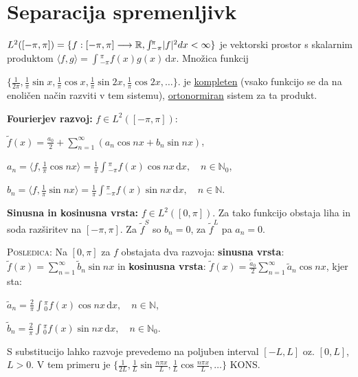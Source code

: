 \documentclass[10pt,a4paper]{amsart}
\theoremstyle{definition} %
\theoremstyle{plain} %
\newcommand{\dx}{\ensuremath{\,\mathrm{d}x}}
\let\oldint\int
\renewcommand{\int}{\oldint \!}
\newcommand{\R}{\mathbb R}
\newcommand{\N}{\mathbb N}
\begin{document}
\thispagestyle{empty}
\setlength{\parindent}{0pt}




\section*{Separacija spremenljivk}

$L^2([-\pi,\pi]) = \{f:[-\pi,\pi]\longrightarrow \R, \int_{-\pi}^\pi |f|^2
\\dx < \infty \}$ je vektorski prostor s skalarnim produktom $\langle f, g\rangle =
\int_{-\pi}^\pi f(x)g(x)\dx$. Množica funkcij

  $\{\frac{1}{2\pi},
  \frac{1}{\pi}\sin{x},\frac{1}{\pi}\cos{x},\frac{1}{\pi}\sin{2x},\frac{1}{\pi}\cos{2x},\ldots
\}$. je \underline{kompleten} (vsako funkcijo se da na enoličen način razviti v
tem sistemu),  \underline{ortonormiran} sistem za ta produkt.

\textbf{Fourierjev razvoj:} $f \in L^2([-\pi,\pi])$:

$\tilde{f}(x) = \frac{a_0}{2} + \sum_{n=1}^{\infty}(a_n\cos{nx} + b_n\sin{nx})$,

$a_n = \langle f,\frac{1}{\pi}\cos{nx} \rangle =
\frac{1}{\pi}\int_{-\pi}^{\pi}f(x)\cos{nx}\dx, \quad n \in \N_0$,

$b_n = \langle f,\frac{1}{\pi}\sin{nx} \rangle =
\frac{1}{\pi}\int_{-\pi}^{\pi}f(x)\sin{nx}\dx, \quad n \in \N$.

\textbf{Sinusna in kosinusna vrsta:} $f \in L^2([0,\pi])$. Za tako funkcijo
obstaja liha in soda razširitev na $[-\pi,\pi]$. Za $\tilde{f}^S$ so $b_n = 0$,
za $\tilde{f}^L$ pa $a_n = 0$.

\textsc{Posledica:} Na $[0,\pi]$ za $f$ obstajata dva razvoja: \textbf{sinusna
vrsta}: $\tilde{f}(x) =  \sum_{n=1}^{\infty} \tilde{b}_n\sin{nx}$ in
\textbf{kosinusna vrsta}:  $\tilde{f}(x) =
\frac{\tilde{a}_0}{2}\sum_{n=1}^{\infty}\tilde{a}_n\cos{nx}$, kjer sta:

$\tilde{a}_n = \frac{2}{\pi}\int_0^{\pi}f(x)\cos{nx}\dx, \quad n \in \N$,

$\tilde{b}_n = \frac{2}{\pi}\int_0^{\pi}f(x)\sin{nx}\dx, \quad n \in \N_0$.

S substitucijo lahko razvoje prevedemo na poljuben interval $[-L,L]$ oz.
$[0,L]$, $L > 0$. V tem primeru je $\{\frac{1}{2L}, \frac{1}{L}\sin{\frac{n\pi
x}{L}},\frac{1}{L}\cos{\frac{n\pi x}{L}},\ldots \}$ KONS.
\end{document}
